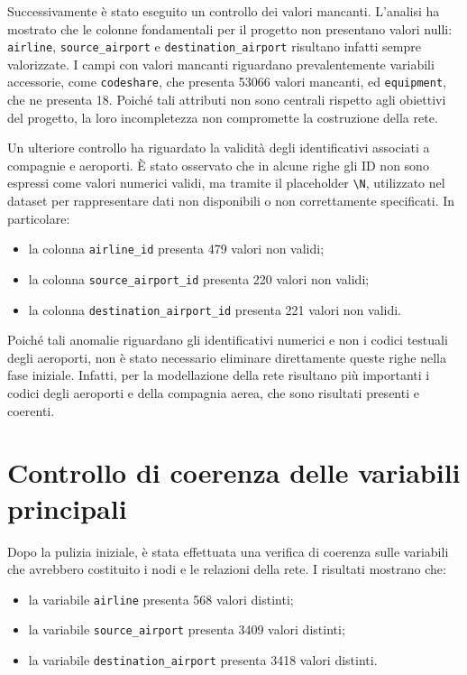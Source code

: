 Successivamente è stato eseguito un controllo dei valori mancanti. L’analisi ha mostrato che le colonne fondamentali per il progetto non presentano valori nulli: \texttt{airline}, \texttt{source\_airport} e \texttt{destination\_airport} risultano infatti sempre valorizzate. I campi con valori mancanti riguardano prevalentemente variabili accessorie, come \texttt{codeshare}, che presenta 53066 valori mancanti, ed \texttt{equipment}, che ne presenta 18. Poiché tali attributi non sono centrali rispetto agli obiettivi del progetto, la loro incompletezza non compromette la costruzione della rete.

Un ulteriore controllo ha riguardato la validità degli identificativi associati a compagnie e aeroporti. È stato osservato che in alcune righe gli ID non sono espressi come valori numerici validi, ma tramite il placeholder \texttt{\textbackslash N}, utilizzato nel dataset per rappresentare dati non disponibili o non correttamente specificati. In particolare:
\begin{itemize}
    \item la colonna \texttt{airline\_id} presenta 479 valori non validi;
    \item la colonna \texttt{source\_airport\_id} presenta 220 valori non validi;
    \item la colonna \texttt{destination\_airport\_id} presenta 221 valori non validi.
\end{itemize}

Poiché tali anomalie riguardano gli identificativi numerici e non i codici testuali degli aeroporti, non è stato necessario eliminare direttamente queste righe nella fase iniziale. Infatti, per la modellazione della rete risultano più importanti i codici degli aeroporti e della compagnia aerea, che sono risultati presenti e coerenti.

\section{Controllo di coerenza delle variabili principali}

Dopo la pulizia iniziale, è stata effettuata una verifica di coerenza sulle variabili che avrebbero costituito i nodi e le relazioni della rete. I risultati mostrano che:
\begin{itemize}
    \item la variabile \texttt{airline} presenta 568 valori distinti;
    \item la variabile \texttt{source\_airport} presenta 3409 valori distinti;
    \item la variabile \texttt{destination\_airport} presenta 3418 valori distinti.
\end{itemize}

